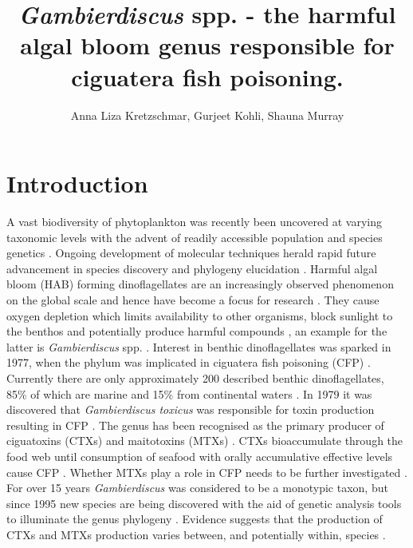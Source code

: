 \documentclass[12pt]{article}
\title{\textbf{ \emph{Gambierdiscus} spp. - the harmful algal bloom genus responsible for ciguatera fish poisoning.}}
\author{Anna Liza Kretzschmar, Gurjeet Kohli, Shauna Murray}
\date{}
\begin{document}
\maketitle
\section{Introduction}
A vast biodiversity of phytoplankton was recently been uncovered at varying taxonomic levels with the advent of readily accessible population and species genetics \cite{simon2009diversity}. Ongoing development of molecular techniques herald rapid future advancement in species discovery and phylogeny elucidation \cite{murray2012genetic,murray2012transcriptomics}. 
Harmful algal bloom (HAB) forming dinoflagellates are an increasingly observed phenomenon on the global scale and hence have become a focus for research \cite{berdalet2012global,hallegraeff2010ocean,garces2012habitat}. They cause oxygen depletion which limits availability to other organisms, block sunlight to the benthos and potentially produce harmful compounds \cite{grandjean2008centers}, an example for the latter is \emph{Gambierdiscus} spp. \cite{lehane2000ciguatera}.
Interest in benthic dinoflagellates was sparked in 1977, when the phylum was implicated in ciguatera fish poisoning (CFP) \cite{yasumoto1977finding}.  
Currently there are only approximately 200 described benthic dinoflagellates, 85\% of which are marine and 15\% from continental waters \cite{gomez2012quantitative}.
In 1979 it was discovered that \emph{Gambierdiscus toxicus} was responsible for toxin production resulting in CFP \cite{adachi1979thecal}. The genus has been recognised as the primary producer of ciguatoxins (CTXs) and maitotoxins (MTXs) \cite{chinain1997intraspecific,holmes1998gambierdiscus}. CTXs bioaccumulate through the food web until consumption of seafood with orally accumulative effective levels cause CFP \cite{bagnis1979clinical,gillespie1987possible,sims1987theoretical}. Whether MTXs play a role in CFP needs to be further investigated \cite{kohli2014feeding}. For over 15 years \emph{Gambierdiscus} was considered to be a monotypic taxon, but since 1995 new species are being discovered with the aid of genetic analysis tools to illuminate the genus phylogeny \cite{faust1995observation,holmes1998gambierdiscus,litaker2009taxonomy,chinain1999morphology,fraga2011gambierdiscus,nishimura2014morphology}. Evidence suggests that the production of CTXs and MTXs production varies between, and potentially within, species \cite{chinain2010growth,holland2013differences}. \\%
\end{document}
